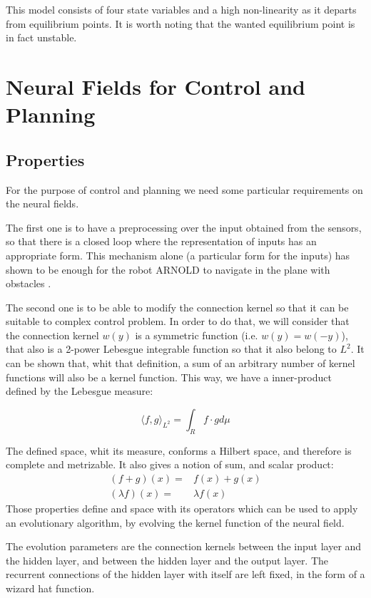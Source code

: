 \documentclass{sig-alternate}
\begin{document}
This model consists of four state variables and a high non-linearity
as it departs from equilibrium points. It is worth noting that the
wanted equilibrium point is in fact unstable.


\section{Neural Fields for Control and Planning}

\subsection*{Properties}
\label{sec:properties}
For the purpose of control and planning we need some particular
requirements on the neural fields.

The first one is to have a preprocessing over the input obtained from
the sensors, so that there is a closed loop where the representation
of inputs has an appropriate form. This mechanism alone (a particular
form for the inputs) has shown to be enough for the robot ARNOLD to
navigate in the plane with obstacles \cite{Bergener99Complex}.

The second one is to be able to modify the connection kernel so that
it can be suitable to complex control problem. In order to do that, we
will consider that the connection kernel $w(y)$ is a symmetric
function (i.e. $w(y)=w(-y)$), that also is a 2-power Lebesgue
integrable function so that it also belong to $L^2$. It can be shown
that, whit that definition, a sum of an arbitrary number of kernel
functions will also be a kernel function. This way, we have a
inner-product defined by the Lebesgue measure:

\begin{equation}
  \label{eq:eq-l2}
  \langle f,g \rangle_{L^2} = \int_{R}{f\cdot g d\mu}
\end{equation}

The defined space, whit its measure, conforms a Hilbert space, and
therefore is complete and metrizable. It also gives a notion of sum,
and scalar product:
\begin{eqnarray}
  \label{eq:eq-leb-opers}
  (f+g)(x)=&f(x)+g(x) \\
  (\lambda f)(x)=&\lambda f(x)
\end{eqnarray}
Those properties define and space with its operators which can be used
to apply an evolutionary algorithm, by evolving the kernel function of
the neural field.

The evolution parameters are the connection kernels between the input
layer and the hidden layer, and between the hidden layer and the
output layer. The recurrent connections of the hidden layer with
itself are left fixed, in the form of a wizard hat function.
\end{document}
